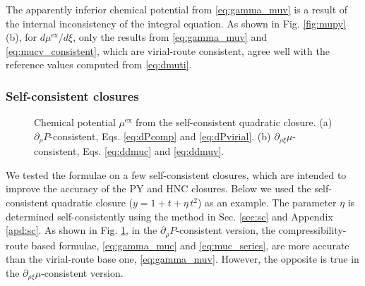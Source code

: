 \documentclass[aip,jcp,reprint,superscriptaddress]{revtex4-1}
\newcommand{\supex}[1]{ { { #1 }^{ \mathrm{ex} } } }
\newcommand{\muex}{\supex{\mu}}
\begin{document}
The apparently inferior chemical potential from \eqref{eq:gamma_muv}
is a result of the internal inconsistency of the integral equation.
%
As shown in Fig. \ref{fig:mupy}(b),
for $d\muex/d\xi$,
only the results from \eqref{eq:gamma_muv} and \eqref{eq:mucv_consistent},
which are virial-route consistent,
agree well with the reference values
computed from \eqref{eq:dmuti}.
%



%
%



\subsubsection{Self-consistent closures}


\begin{figure}[h]
  \caption{
    \label{fig:musqr}
    Chemical potential $\muex$ from the self-consistent quadratic closure.
    (a) $\partial_\rho P$-consistent, Eqs. \eqref{eq:dPcomp} and \eqref{eq:dPvirial}.
    (b) $\partial_{\rho \xi} \mu$-consistent, Eqs. \eqref{eq:ddmuc} and \eqref{eq:ddmuv}.
  }
\end{figure}


We tested the formulae on a few self-consistent closures,
which are intended to improve the accuracy of the PY and HNC closures.
%
Below we used the self-consistent quadratic closure ($y = 1 + t + \eta \, t^2$) as an example.
%
The parameter $\eta$ is determined self-consistently using the method in Sec. \ref{sec:sc}
and Appendix \ref{apd:sc}.
%
As shown in Fig. \ref{fig:musqr},
%
in the $\partial_\rho P$-consistent version,
the compressibility-route based formulae,
\eqref{eq:gamma_muc} and \eqref{eq:muc_series},
are more accurate than the virial-route base one,
\eqref{eq:gamma_muv}.
%
However, the opposite is true in the $\partial_{\rho \xi} \mu$-consistent version.
%
%
\end{document}
